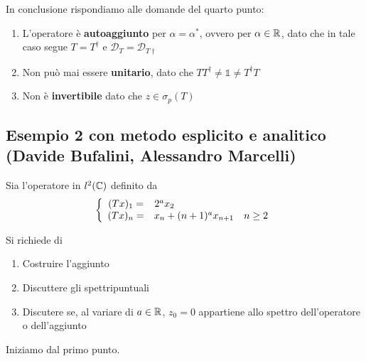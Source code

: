 In conclusione rispondiamo alle domande del quarto punto:
\begin{enumerate}
	\item L'operatore è \textbf{autoaggiunto} per $\alpha = \alpha^*$, ovvero per $\alpha \in \mathbb{R}$, dato che in tale caso segue $T= T^\dagger$ e $\mathcal{D}_T=\mathcal{D}_{T\dagger}$
	\item Non può mai essere \textbf{unitario}, dato che $TT^\dagger \neq \mathbb{1} \neq T^\dagger T$
	\item Non è \textbf{invertibile} dato che $z\in \sigma_p(T)$
\end{enumerate}


\newpage

\subsection{Esempio 2 con metodo esplicito e analitico (Davide Bufalini, Alessandro Marcelli)}

Sia l'operatore in $l^2(\mathbb{C})$ definito da
\begin{align}
	\left\{ \begin{array}{cc} (Tx)_1 =& 2^a x_2\quad\quad\quad\quad\quad\quad\quad\quad\;\;\;\;\;\\ (Tx)_n =& x_n + (n+1)^ax_{n+1} \quad n \geq 2 \end{array} \right.
\end{align}

Si richiede di
\begin{enumerate}
	\item Costruire l'aggiunto
	\item Discuttere gli spettripuntuali
	\item Discutere se, al variare di $a\in\mathbb{R}$, $z_0=0$ appartiene allo spettro dell'operatore o dell'aggiunto
\end{enumerate}


Iniziamo dal primo punto.

